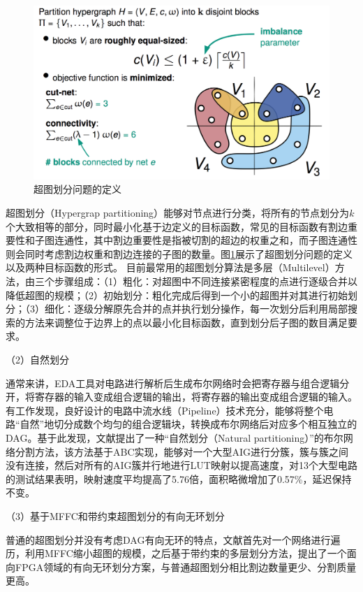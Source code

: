 \begin{figure}[!htbp]
    \centering
    \includegraphics[width=0.8\linewidth]{./figs/Hypergraph_partition.png}
    \caption{超图划分问题的定义}
    \label{Hypergraph_partition}
\end{figure}

超图划分（Hypergrap partitioning）\cite{KaHyPar}能够对节点进行分类，将所有的节点划分为$k$个大致相等的部分，同时最小化基于边定义的目标函数，常见的目标函数有割边重要性和子图连通性，其中割边重要性是指被切割的超边的权重之和，而子图连通性则会同时考虑割边权重和割边连接的子图的数量。图\ref{Hypergraph_partition}展示了超图划分问题的定义以及两种目标函数的形式。
目前最常用的超图划分算法是多层（Multilevel）方法，由三个步骤组成：（1）粗化：对超图中不同连接紧密程度的点进行逐级合并以降低超图的规模；（2）初始划分：粗化完成后得到一个小的超图并对其进行初始划分；（3）细化：逐级分解原先合并的点并执行划分操作，每一次划分后利用局部搜索的方法来调整位于边界上的点以最小化目标函数，直到划分后子图的数目满足要求。

（2）自然划分

通常来讲，EDA工具对电路进行解析后生成布尔网络时会把寄存器与组合逻辑分开，将寄存器的输入变成组合逻辑的输出，将寄存器的输出变成组合逻辑的输入。有工作发现，良好设计的电路中流水线（Pipeline）技术充分，能够将整个电路“自然”地切分成数个均匀的组合逻辑块，转换成布尔网络后对应多个相互独立的DAG。基于此发现，文献\cite{Moucheng_Yang}提出了一种“自然划分（Natural partitioning）”的布尔网络分割方法，该方法基于ABC\cite{LS:ABC}实现，能够对一个大型AIG进行分簇，簇与簇之间没有连接，然后对所有的AIG簇并行地进行LUT映射以提高速度，对13个大型电路的测试结果表明，映射速度平均提高了5.76倍，面积略微增加了0.57\%，延迟保持不变。

（3）基于MFFC和带约束超图划分的有向无环划分

普通的超图划分并没有考虑DAG有向无环的特点，文献\cite{FPGA:Jason_Cong_patition}首先对一个网络进行遍历，利用MFFC缩小超图的规模，之后基于带约束的多层划分方法，提出了一个面向FPGA领域的有向无环划分方案，与普通超图划分相比割边数量更少、分割质量更高。

